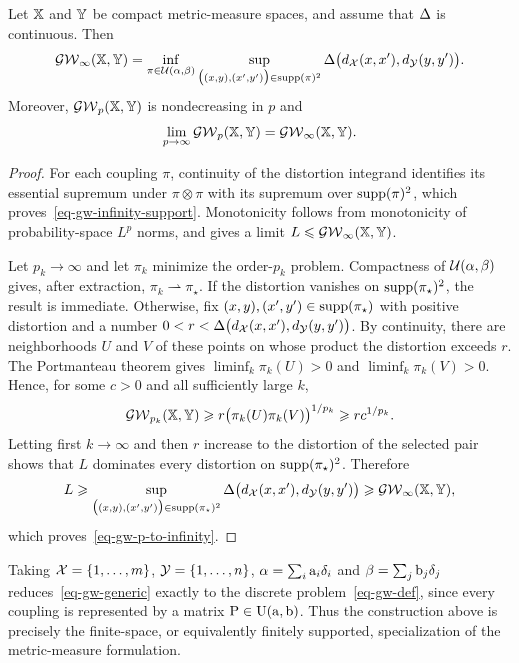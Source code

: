 \begin{prop}\label{prop-gw-infinite-order-limit}
	Let $\mathbb{X}$ and $\mathbb{Y}$ be compact metric-measure spaces, and assume that $\Delta$ is continuous. Then
	\begin{equation}\label{eq-gw-infinity-support}
		\operatorname{\mathcal{GW}}_\infty(\mathbb{X},\mathbb{Y})
		=
		\inf_{\pi\in\mathcal{U}(\alpha,\beta)}
		\sup_{\bigl((x,y),(x',y')\bigr)\in\operatorname{supp}(\pi)^2}
		\Delta\bigl(d_{\mathcal{X}}(x,x'),d_{\mathcal{Y}}(y,y')\bigr).
	\end{equation}
	Moreover, $\operatorname{\mathcal{GW}}_p(\mathbb{X},\mathbb{Y})$ is nondecreasing in $p$ and
	\begin{equation}\label{eq-gw-p-to-infinity}
		\lim_{p\to\infty}\operatorname{\mathcal{GW}}_p(\mathbb{X},\mathbb{Y})
		=
		\operatorname{\mathcal{GW}}_\infty(\mathbb{X},\mathbb{Y}).
	\end{equation}
\end{prop}
\begin{proof}
	For each coupling $\pi$, continuity of the distortion integrand identifies its essential supremum under $\pi\otimes\pi$ with its supremum over $\operatorname{supp}(\pi)^2$, which proves~\eqref{eq-gw-infinity-support}. Monotonicity follows from monotonicity of probability-space $L^p$ norms, and gives a limit $L\leqslant\operatorname{\mathcal{GW}}_\infty(\mathbb{X},\mathbb{Y})$.

	Let $p_k\to\infty$ and let $\pi_k$ minimize the order-$p_k$ problem. Compactness of $\mathcal{U}(\alpha,\beta)$ gives, after extraction, $\pi_k\rightharpoonup\pi_\star$. If the distortion vanishes on $\operatorname{supp}(\pi_\star)^2$, the result is immediate. Otherwise, fix $(x,y),(x',y')\in\operatorname{supp}(\pi_\star)$ with positive distortion and a number
	$0<r<\Delta\bigl(d_{\mathcal{X}}(x,x'),d_{\mathcal{Y}}(y,y')\bigr)$.
	By continuity, there are neighborhoods $U$ and $V$ of these points on whose product the distortion exceeds $r$. The Portmanteau theorem gives $\liminf_k\pi_k(U)>0$ and $\liminf_k\pi_k(V)>0$. Hence, for some $c>0$ and all sufficiently large $k$,
	\[
		\operatorname{\mathcal{GW}}_{p_k}(\mathbb{X},\mathbb{Y})
		\geqslant
		r\bigl(\pi_k(U)\pi_k(V)\bigr)^{1/p_k}
		\geqslant
		rc^{1/p_k}.
	\]
	Letting first $k\to\infty$ and then $r$ increase to the distortion of the selected pair shows that $L$ dominates every distortion on $\operatorname{supp}(\pi_\star)^2$. Therefore
	\[
		L
		\geqslant
		\sup_{\bigl((x,y),(x',y')\bigr)\in\operatorname{supp}(\pi_\star)^2}
		\Delta\bigl(d_{\mathcal{X}}(x,x'),d_{\mathcal{Y}}(y,y')\bigr)
		\geqslant
		\operatorname{\mathcal{GW}}_\infty(\mathbb{X},\mathbb{Y}),
	\]
	which proves~\eqref{eq-gw-p-to-infinity}.
\end{proof}
Taking $\mathcal{X}=\{1,\ldots,m\}$, $\mathcal{Y}=\{1,\ldots,n\}$, $\alpha=\sum_i \mathrm{a}_i\delta_i$ and $\beta=\sum_j \mathrm{b}_j\delta_j$ reduces~\eqref{eq-gw-generic} exactly to the discrete problem~\eqref{eq-gw-def}, since every coupling is represented by a matrix $\mathrm{P}\in\mathrm{U}(\mathrm{a},\mathrm{b})$. Thus the construction above is precisely the finite-space, or equivalently finitely supported, specialization of the metric-measure formulation.

